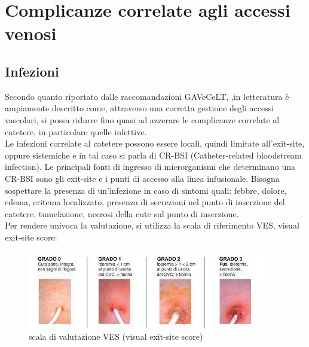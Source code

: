 \section{Complicanze correlate agli accessi venosi}

\subsection{Infezioni}

Secondo quanto riportato dalle raccomandazioni GAVeCeLT, ,in letteratura è ampiamente descritto come, attraverso una 
corretta gestione degli accessi vascolari, si possa ridurre fino quasi ad azzerare le complicanze correlate al 
catetere, in particolare quelle infettive\cite{GAVECELTracc2021}.\\
Le infezioni correlate al catetere possono essere locali, quindi limitate all’exit-site, oppure sistemiche e in tal 
caso si parla di CR-BSI (Catheter-related bloodstream infection). Le principali fonti di ingresso di microrganismi 
che determinano una CR-BSI sono gli exit-site e i punti di accesso alla linea infusionale. 
Bisogna sospettare la presenza di un’infezione in caso di sintomi quali: febbre, dolore, edema, eritema localizzato, 
presenza di secrezioni nel punto di inserzione del catetere, tumefazione, necrosi della cute sul punto di inserzione\cite{AIOMCVC}.\\
Per rendere univoca la valutazione, si utilizza la scala di riferimento VES, visual exit-site score:

\begin{figure}[H]
    \begin{center}
    \includegraphics[width=0.7\columnwidth]{img/VES.jpeg}
    \end{center}
    \caption[Scala di valutazione VES (visual exit-site score)]{scala di valutazione VES (visual exit-site score)
    \cite{img51}}

\end{figure}


